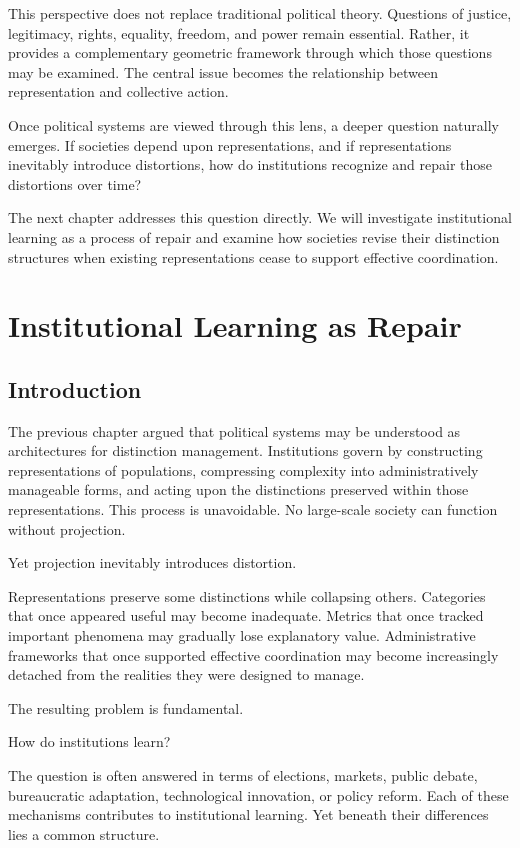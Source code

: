 \documentclass[11pt,oneside,openany]{book}
\begin{document}
This perspective does not replace traditional political theory. Questions of justice, legitimacy, rights, equality, freedom, and power remain essential. Rather, it provides a complementary geometric framework through which those questions may be examined. The central issue becomes the relationship between representation and collective action.

Once political systems are viewed through this lens, a deeper question naturally emerges. If societies depend upon representations, and if representations inevitably introduce distortions, how do institutions recognize and repair those distortions over time?

The next chapter addresses this question directly. We will investigate institutional learning as a process of repair and examine how societies revise their distinction structures when existing representations cease to support effective coordination.

\chapter{Institutional Learning as Repair}

\section{Introduction}

The previous chapter argued that political systems may be understood as architectures for distinction management. Institutions govern by constructing representations of populations, compressing complexity into administratively manageable forms, and acting upon the distinctions preserved within those representations. This process is unavoidable. No large-scale society can function without projection.

Yet projection inevitably introduces distortion.

Representations preserve some distinctions while collapsing others. Categories that once appeared useful may become inadequate. Metrics that once tracked important phenomena may gradually lose explanatory value. Administrative frameworks that once supported effective coordination may become increasingly detached from the realities they were designed to manage.

The resulting problem is fundamental.

How do institutions learn?

The question is often answered in terms of elections, markets, public debate, bureaucratic adaptation, technological innovation, or policy reform. Each of these mechanisms contributes to institutional learning. Yet beneath their differences lies a common structure.
\end{document}
